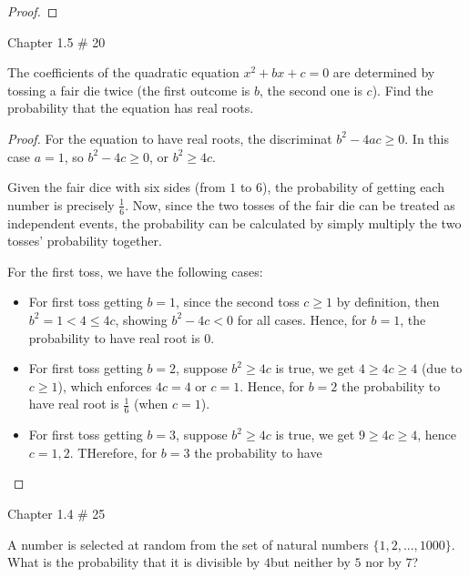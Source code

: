 \documentclass{article}
\begin{document}
\begin{proof}
\end{proof}

\newpage


\begin{ques}\label{q6}
    Chapter 1.5 \# 20

    The coefficients of the quadratic equation $x^2+bx+c=0$ are determined by tossing a fair die twice (the first outcome is $b$, the second one is $c$). Find the probability that the equation has real roots.
\end{ques}

\begin{proof}
    For the equation to have real roots, the discriminat $b^2 - 4ac\geq 0$. In this case $a=1$, so $b^2-4c\geq 0$, or $b^2\geq 4c$.

    Given the fair dice with six sides (from $1$ to $6$), the probability of getting each number is precisely $\frac{1}{6}$. Now, since the two tosses of the fair die can be treated as independent events, the probability can be calculated by simply multiply the two tosses' probability together. 
    
    For the first toss, we have the following cases:
    \begin{itemize}
        \item For first toss getting $b=1$, since the second toss $c\geq 1$ by definition, then $b^2 = 1<4 \leq 4c$, showing $b^2-4c<0$ for all cases. Hence, for $b=1$, the probability to have real root is $0$.
        \item For first toss getting $b=2$, suppose $b^2 \geq 4c$ is true, we get $4 \geq 4c \geq 4$ (due to $c\geq 1$), which enforces $4c=4$ or $c=1$. Hence, for $b=2$ the probability to have real root is $\frac{1}{6}$ (when $c=1$).
        \item For first toss getting $b=3$, suppose $b^2\geq 4c$ is true, we get $9\geq 4c\geq 4$, hence $c=1,2$. THerefore, for $b=3
$ the probability to have     \end{itemize}
\end{proof}

\newpage

\begin{ques}\label{q7}
    Chapter 1.4 \# 25

    A number is selected at random from the set of natural numbers $\{1,2,...,1000\}$. What is the probability that it is divisible by $4$but neither by $5$ nor by $7$?
\end{ques}
\end{document}
